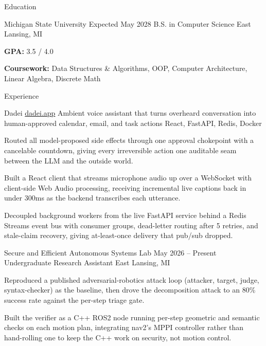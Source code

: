 \documentclass[
	11pt
]{../../../template}
\begin{document}
	\begin{rSection}{E}{ducation}
		\begin{rSectionEntry}
			{Michigan State University}
			{Expected May 2028}
			{B.S. in Computer Science}
			{}
			{East Lansing, MI}

			\item \textbf{GPA:} 3.5 / 4.0
			\item \textbf{Coursework:} Data Structures \& Algorithms, OOP, Computer Architecture, Linear Algebra, Discrete Math
		\end{rSectionEntry}
	\end{rSection}

	\begin{rSection}{E}{xperience}
		\begin{rSectionEntry}
			{Dadei}
			{\href{https://dadei.app}{dadei.app}}
			{Ambient voice assistant that turns overheard conversation into human-approved calendar, email, and task actions}
			{React, FastAPI, Redis, Docker}
			{}

			\item Routed all model-proposed side effects through one approval chokepoint with a cancelable countdown, giving every irreversible action one auditable seam between the LLM and the outside world.
			\item Built a React client that streams microphone audio up over a WebSocket with client-side Web Audio processing, receiving incremental live captions back in under 300ms as the backend transcribes each utterance.
			\item Decoupled background workers from the live FastAPI service behind a Redis Streams event bus with consumer groups, dead-letter routing after 5 retries, and stale-claim recovery, giving at-least-once delivery that pub/sub dropped.
		\end{rSectionEntry}

		\begin{rSectionEntry}
			{Secure and Efficient Autonomous Systems Lab}
			{May 2026 -- Present}
			{Undergraduate Research Assistant}
			{}
			{East Lansing, MI}

			\item Reproduced a published adversarial-robotics attack loop (attacker, target, judge, syntax-checker) as the baseline, then drove the decomposition attack to an 80\% success rate against the per-step triage gate.
			\item Built the verifier as a C++ ROS2 node running per-step geometric and semantic checks on each motion plan, integrating nav2's MPPI controller rather than hand-rolling one to keep the C++ work on security, not motion control.
		\end{rSectionEntry}


\end{rSection}
\end{document}
